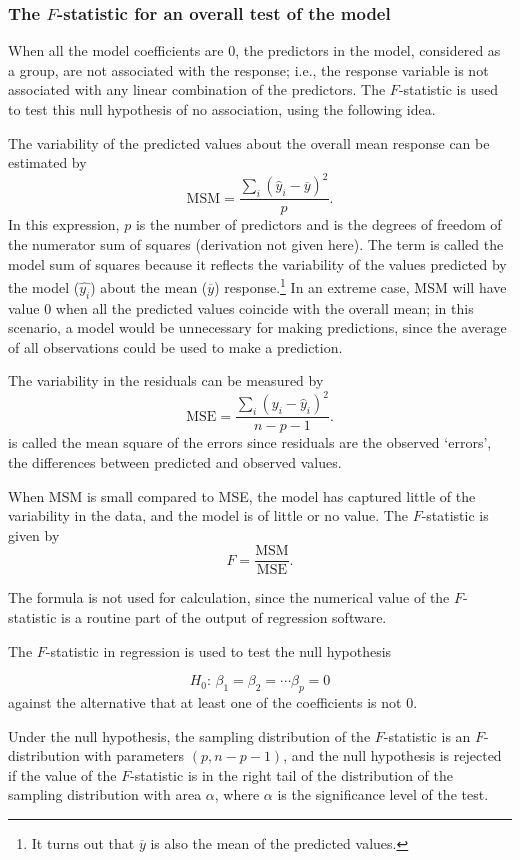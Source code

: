 \subsubsection{The $F$-statistic for an overall test of the model}

When all the model coefficients are 0, the predictors in the model, considered as a group, are not associated with the response; i.e., the response variable is not associated with any linear combination of the predictors. The $F$-statistic is used to test this null hypothesis of no association, using the following idea.  

The variability of the predicted values about the overall mean response can be estimated by
\[
   \text{MSM} =  \frac{\sum_i(\hat{y}_i - \overline{y})^2}{p}.
\]
In this expression, $p$ is the number of predictors and is the degrees of freedom of the numerator sum of squares (derivation not given here).  The term  is called the model sum of squares because it reflects the variability of the values predicted by the model ($\hat{y_i}$) about the mean ($\overline{y}$) response.\footnote{It turns out that $\overline{y}$ is also the mean of the predicted values.} In an extreme case, MSM will have value 0 when all the predicted values coincide with the overall mean; in this scenario, a model would be unnecessary for making predictions, since the average of all observations could be used to make a prediction.

The variability in the residuals can be measured by 
\[
  \text{MSE} = \frac{\sum_i(y_i - \hat{y}_i)^2}{n - p - 1}.
\]
 is called the mean square of the errors since residuals are
the observed `errors', the differences between predicted and observed
values.

When MSM is small compared to MSE, the model has captured little of the variability in the data, and the model is of little or no value.  The $F$-statistic is given by
\[
  F = \frac{\text{MSM}}{\text{MSE}}.
\]

The formula is not used for calculation, since the numerical value of the $F$-statistic is a routine part of the output of regression software.

\begin{termBox}{
The $F$-statistic in regression is used to test the null hypothesis 

\[
  H_0:\, \beta_1 = \beta_2 = \cdots \beta_p = 0
\]
against the alternative that at least one of the coefficients is not 0.

Under the null hypothesis, the sampling distribution of the $F$-statistic is an $F$-distribution with parameters $(p, n - p - 1)$, and the null hypothesis is rejected if the value of the $F$-statistic is in the right tail of the distribution of the sampling distribution with area $\alpha$, where $\alpha$ is the significance level of the test.}
\end{termBox}

